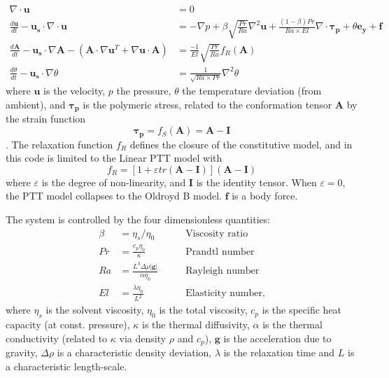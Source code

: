 \documentclass[notitlepage]{revtex4-2}
\begin{document}
\begin{subequations}
\begin{align}\nabla\cdot\bm{u}&=0\label{eq:mass}\\
\frac{d\bm{u}}{dt}-\bm{u_{s}}\cdot\nabla\cdot\bm{u}&=-\nabla{p}+\beta\sqrt{\frac{Pr}{Ra}}\nabla^{2}\bm{u}+\frac{\left(1-\beta\right)Pr}{Ra\times{El}}\nabla\cdot\bm{\tau_{p}}+\theta\bm{e_{y}}+\bm{f}\label{eq:mom}\\
\frac{d\bm{A}}{dt}-\bm{u_{s}}\cdot\nabla\bm{A}-\left(\bm{A}\cdot\nabla\bm{u}^{T}+\nabla\bm{u}\cdot\bm{A}\right)&=\frac{-1}{El}\sqrt{\frac{Pr}{Ra}}f_{R}\left(\bm{A}\right)\label{eq:conf}\\
\frac{d\theta}{dt}-\bm{u_{s}}\cdot\nabla\theta&=\frac{1}{\sqrt{Ra\times{Pr}}}\nabla^{2}\theta\label{eq:heat}\end{align}\label{eq:ce}\end{subequations}
where $\bm{u}$ is the velocity, $p$ the pressure, $\theta$ the temperature deviation (from ambient), and $\bm{\tau_{p}}$ is the polymeric stress, related to the conformation tensor $\bm{A}$ by  the strain function 
\begin{equation}\bm{\tau_{p}}=f_{S}\left(\bm{A}\right)=\bm{A}-\bm{I}\end{equation}. The relaxation function $f_{R}$ 
defines the closure of the constitutive model, and in this code is limited to the Linear PTT model with
\begin{equation}f_{R}=\left[1+\varepsilon{tr}\left(\bm{A}-\bm{I}\right)\right]\left(\bm{A}-\bm{I}\right)\end{equation}
where $\varepsilon$ is the degree of non-linearity, and $\bm{I}$ is the identity tensor. When $\varepsilon=0$, the PTT model collapses to the Oldroyd B model. $\bm{f}$ is a body force.

The system is controlled by the four dimensionless quantities:
\begin{subequations}
\begin{align}\beta&=\eta_{s}/\eta_{0}\qquad&\text{Viscosity ratio}\\
Pr&=\frac{c_{p}\eta_{0}}{\kappa}\qquad&\text{Prandtl number}\\
Ra&=\frac{L^{3}\Delta\rho\left\lvert\bm{g}\right\rvert}{\alpha\eta_{0}}\qquad&\text{Rayleigh number}\\
El&=\frac{\lambda\eta_{0}}{L^{2}}\qquad&\text{Elasticity number},
\end{align}\end{subequations}
where $\eta_{s}$ is the solvent viscosity, $\eta_{0}$ is the total viscosity, $c_{p}$ is the specific heat capacity (at const. pressure), $\kappa$ is the thermal diffusivity, $\alpha$ is the thermal conductivity (related to $\kappa$ via density $\rho$ and $c_{p}$), $\bm{g}$ is the acceleration due to gravity, $\Delta\rho$ is a characteristic density deviation, $\lambda$ is the relaxation time and $L$ is a characteristic length-scale.
\end{document}
